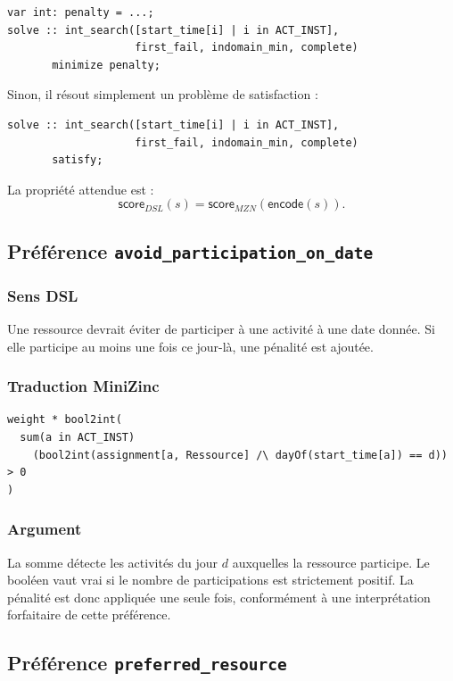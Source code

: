 \documentclass[12pt,a4paper]{article}
\newcommand{\encode}{\mathsf{encode}}
\newcommand{\scoreDSL}{\mathsf{score}_{DSL}}
\newcommand{\scoreMZN}{\mathsf{score}_{MZN}}
\begin{document}
\begin{lstlisting}[language=MiniZinc]
var int: penalty = ...;
solve :: int_search([start_time[i] | i in ACT_INST],
                    first_fail, indomain_min, complete)
       minimize penalty;
\end{lstlisting}

Sinon, il résout simplement un problème de satisfaction :

\begin{lstlisting}[language=MiniZinc]
solve :: int_search([start_time[i] | i in ACT_INST],
                    first_fail, indomain_min, complete)
       satisfy;
\end{lstlisting}

La propriété attendue est :
\[
\scoreDSL(s) = \scoreMZN(\encode(s)).
\]

\subsection{Préférence \texttt{avoid\_participation\_on\_date}}

\subsubsection*{Sens DSL}

Une ressource devrait éviter de participer à une activité à une date donnée. Si elle participe au moins une fois ce jour-là, une pénalité est ajoutée.

\subsubsection*{Traduction MiniZinc}

\begin{lstlisting}[language=MiniZinc]
weight * bool2int(
  sum(a in ACT_INST)
    (bool2int(assignment[a, Ressource] /\ dayOf(start_time[a]) == d)) > 0
)
\end{lstlisting}

\subsubsection*{Argument}

La somme détecte les activités du jour $d$ auxquelles la ressource participe. Le booléen vaut vrai si le nombre de participations est strictement positif. La pénalité est donc appliquée une seule fois, conformément à une interprétation forfaitaire de cette préférence.

\subsection{Préférence \texttt{preferred\_resource}}
\end{document}
